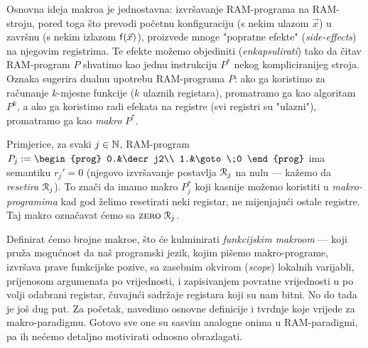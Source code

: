 Osnovna ideja makroa je jednostavna: izvršavanje RAM-programa na RAM-stroju, pored toga što prevodi početnu konfiguraciju (s nekim ulazom $\vec x$) u završnu (s nekim izlazom $\f{f}(\vec x)$), proizvede mnoge "popratne efekte" (\emph{side-effects}) na njegovim registrima. Te efekte možemo objediniti (\emph{enkapsulirati}) tako da čitav RAM-program $P$ shvatimo kao jednu instrukciju $P^*$ nekog kompliciranijeg stroja. 
Oznaka sugerira dualnu upotrebu RAM-programa $P$: ako ga koristimo za računanje $k$-mjesne funkcije ($k$ ulaznih registara), promatramo ga kao algoritam $P^k$, a ako ga koristimo radi efekata na registre (svi registri su "ulazni"), promatramo ga kao \emph{makro} $P^*$.

Primjerice, za svaki $j\in{\mathbb N}$, RAM-program $P_j:=\begin{prog}
0.&\decr j2\\
1.&\goto\;0
\end{prog}$ ima semantiku $r_j'=0$ (njegovo izvršavanje postavlja $\mathcal R_{j}$ na nulu --- kažemo da \emph{resetira} $\mathcal R_{j}$). To znači da imamo makro $P_j^*$ koji kasnije možemo koristiti u \emph{makro-programima} kad god želimo resetirati neki registar, ne mijenjajući ostale registre. Taj makro označavat ćemo sa $\textsc{zero}\;\mathcal R_{j}$.

Definirat ćemo brojne makroe, što će kulminirati \emph{funkcijskim makroom} --- koji pruža mogućnost da naš programski jezik, kojim pišemo makro-programe, izvršava prave funkcijske pozive, sa zasebnim okvirom (\emph{scope}) lokalnih varijabli, prijenosom argumenata po vrijednosti, i zapisivanjem povratne vrijednosti u po volji odabrani registar, čuvajući sadržaje registara koji su nam bitni. No do tada je još dug put. Za početak, navedimo osnovne definicije i tvrdnje koje vrijede za makro-paradigmu. Gotovo sve one su sasvim analogne onima u RAM-paradigmi, pa ih nećemo detaljno motivirati odnosno obrazlagati.

